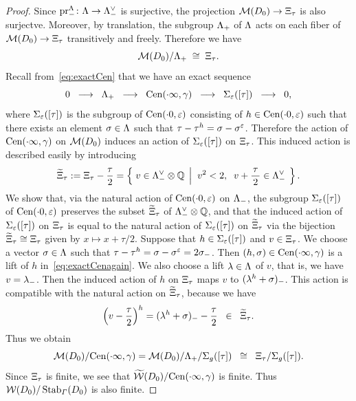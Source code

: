 \documentclass{amsart} %
\begin{document}
\begin{proof}
Since $\operatorname{pr}^{\Lambda}_{-}\colon \Lambda \to \Lambda_{-}^{\vee}$ is surjective,
the projection $\mathord{\mathcal{M}}(D_0) \to \Xi_{\tau}$ is also surjectve.
Moreover, by translation,
the subgroup $\Lambda_{+}$ of $\Lambda$ acts on each fiber of $\mathord{\mathcal{M}}(D_0) \to \Xi_{\tau}$ 
transitively and freely.
Therefore we have 
\[
\mathord{\mathcal{M}}(D_0)/\Lambda_{+} \;\cong \; \Xi_{\tau}. 
\]
Recall from~\eqref{eq:exactCen} that
we have an exact sequence
%
\begin{equation}\label{eq:exactCenagain}
0\;\;\longrightarrow\;\;\Lambda_{+}\;\; \longrightarrow \;\; 
\mathrm{Cen}(\cdot \infty, \gamma)
\;\; \longrightarrow \;\; 
\Sigma_{\varepsilon}([\tau])
\;\; \longrightarrow \;\; 0,
\end{equation}
%
where $\Sigma_{\varepsilon}([\tau])$ is the subgroup of $\mathrm{Cen}(\cdot 0, \varepsilon)$
consisting of $h\in \mathrm{Cen}(\cdot 0, \varepsilon)$ such that 
there exists an element $\sigma\in \Lambda$ such that $\tau-\tau^h=\sigma-\sigma^{\varepsilon}$.
Therefore the action 
of $\mathrm{Cen}(\cdot \infty, \gamma)$ on $\mathord{\mathcal{M}}(D_0)$ induces an action of 
$\Sigma_{\varepsilon}([\tau])$ on $\Xi_{\tau}$. 
This induced action is described easily by introducing 
%
\begin{equation}\label{eq:tilXi}
\widetilde{\Xi}_{\tau}:=\Xi_{\tau} -\dfrac{\tau}{2}
=\left\{\; {v\in \Lambda_{-}^{\vee}\otimes\mathord{\mathbb{Q}}} \; \left\vert \; {\;v^2<2, \;\; v+\dfrac{\tau}{\,2\,}\in \Lambda_{-}^{\vee}} \; \right.\right \}.
\end{equation}
%
We show that, via the natural action of $\mathrm{Cen}(\cdot 0, \varepsilon)$ on $\Lambda_{-}$,
the subgroup 
$\Sigma_{\varepsilon}([\tau])$ of $\mathrm{Cen}(\cdot 0, \varepsilon)$
preserves the subset $\widetilde{\Xi}_{\tau}$ of $\Lambda_{-}^{\vee}\otimes\mathord{\mathbb{Q}}$,
and that 
the induced action of 
$\Sigma_{\varepsilon}([\tau])$ on $\Xi_{\tau}$
is equal to the natural action of $\Sigma_{\varepsilon}([\tau])$ on $\widetilde{\Xi}_{\tau}$
via the 
bijection $\widetilde{\Xi}_{\tau}\cong \Xi_{\tau}$ given by 
$x\mapsto x+\tau/2$.
Suppose that $h\in \Sigma_{\varepsilon}([\tau])$ and $v\in \Xi_{\tau}$.
We choose a vector $\sigma\in \Lambda$ such that $\tau-\tau^h=\sigma-\sigma^\varepsilon=2\sigma_{-}$.
Then $(h, \sigma)\in \mathrm{Cen}(\cdot \infty, \gamma)$ is a lift of $h$ in~\eqref{eq:exactCenagain}.
We also choose a lift $\lambda\in \Lambda$ of $v$,
that is, we have $v=\lambda\sb{-}$.
Then the induced action of $h$ on $\Xi_{\tau}$ maps $v$ to $(\lambda^h+\sigma)\sb{-}$.
This action is compatible with the natural action on $\widetilde{\Xi}_{\tau}$,  because we have 
\[
\left(v-\dfrac{\tau}{2}\right)^h=(\lambda^h+\sigma)_{-}-\dfrac{\tau}{2}\;\;\in\;\;\widetilde{\Xi}_{\tau}.
\]
 Thus we obtain 
%
\begin{equation}\label{eq:orbitss}
 \MMM(D_0)/\Cen(\dotinf, \gamma)= \MMM(D_0)/\Leechplus/\Sigma_{g}([\tau])\;\;\cong\;\; \Xitau/\Sigma_{g}([\tau]). %
\end{equation}
%
Since $\Xi_{\tau}$ is finite, 
we see that 
$\widetilde{\mathord{\mathcal{W}}}(D_0)/\mathrm{Cen}(\cdot \infty, \gamma)$ is finite. 
Thus $\mathord{\mathcal{W}}(D_0)/\operatorname{Stab}_{\varGamma}(D_0)$ is also finite. 
%
\end{proof}
\end{document}
